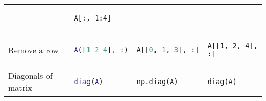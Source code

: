 \documentclass[10pt, landscape]{article}
\begin{document}
\begin{multicols}{2}
\begin{tabular}[]{@{}llll@{}}
\begin{minipage}[t]{0.23\columnwidth}
\end{minipage} & \begin{minipage}[t]{0.20\columnwidth}\raggedright
\begin{lstlisting}
A[:, 1:4]
\end{lstlisting}

\end{minipage}\tabularnewline
\begin{minipage}[t]{0.23\columnwidth}\raggedright
Remove a row
\end{minipage} & \begin{minipage}[t]{0.23\columnwidth}\raggedright
\begin{lstlisting}[language=Matlab]
A([1 2 4], :)
\end{lstlisting}

\end{minipage} & \begin{minipage}[t]{0.23\columnwidth}\raggedright
\begin{lstlisting}[language=Python]
A[[0, 1, 3], :]
\end{lstlisting}

\end{minipage} & \begin{minipage}[t]{0.20\columnwidth}\raggedright
\begin{lstlisting}
A[[1, 2, 4], :]
\end{lstlisting}

\end{minipage}\tabularnewline
\begin{minipage}[t]{0.23\columnwidth}\raggedright
Diagonals of matrix
\end{minipage} & \begin{minipage}[t]{0.23\columnwidth}\raggedright
\begin{lstlisting}[language=Matlab]
diag(A)
\end{lstlisting}

\end{minipage} & \begin{minipage}[t]{0.23\columnwidth}\raggedright
\begin{lstlisting}[language=Python]
np.diag(A)
\end{lstlisting}

\end{minipage} & \begin{minipage}[t]{0.20\columnwidth}\raggedright
\begin{lstlisting}
diag(A)
\end{lstlisting}


\end{minipage}
\end{tabular}
\end{multicols}
\end{document}
